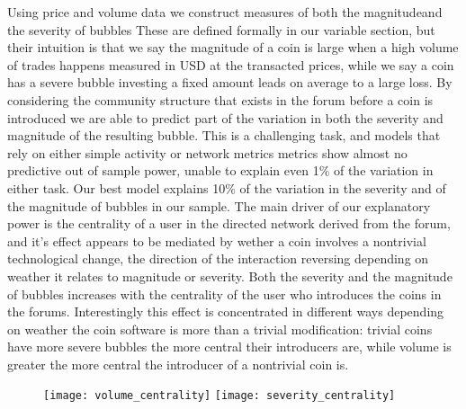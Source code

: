 Using price and volume data we construct measures of both the magnitudeand the severity of bubbles
These are defined formally in our variable section, but their intuition is that we say the magnitude of a coin is large when a high volume of trades happens measured in USD at the transacted prices, while we say a coin has a severe bubble investing a fixed amount leads on average to a large loss. 
By considering the community structure that exists in the forum before a coin is introduced we are able to predict part of the variation in both the severity and magnitude of the resulting bubble.
This is a challenging task, and models that rely on either simple activity or network metrics metrics show almost no predictive out of sample power, unable to explain even 1\% of the variation in either task.
Our best model explains 10\% of the variation in the severity and of the magnitude of bubbles in our sample.
The main driver of our explanatory power is the centrality of a user in the directed network derived from the forum, and it's effect appears to be mediated by wether a coin involves a nontrivial technological change, the direction of the interaction reversing depending on weather it relates to magnitude or severity. 
Both the severity and the magnitude of bubbles increases with the centrality of the user who introduces the coins in the forums.	
Interestingly this effect is concentrated in different ways depending on weather the coin software is more than a trivial modification: trivial coins have more severe bubbles the more central their introducers are, while volume is greater the more central the introducer of a nontrivial coin is.





\begin{figure}
\texttt{[image: volume\_centrality]}
\texttt{[image: severity\_centrality]}
\end{figure}

